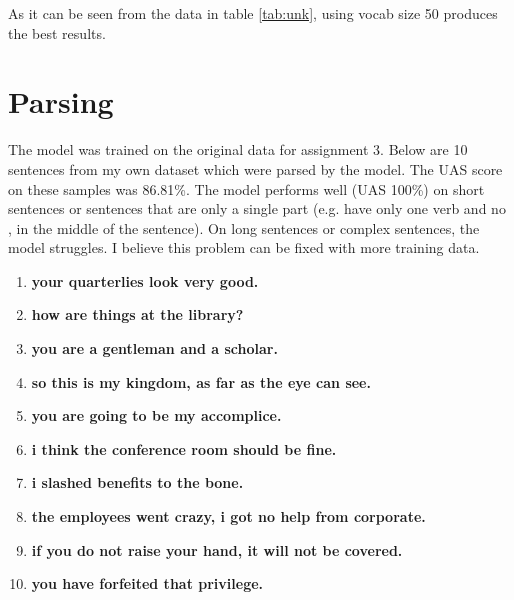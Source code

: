 \documentclass[11pt]{article}
\begin{document}
As it can be seen from the data in table \ref{tab:unk}, using vocab size 50 produces the best results.

\section{Parsing}

The model was trained on the original data for assignment 3. Below are 10 sentences from my own dataset which were parsed by the model. The UAS score on these samples was 86.81\%. The model performs well (UAS 100\%) on short sentences or sentences that are only a single part (e.g. have only one verb and no , in the middle of the sentence). On long sentences or complex sentences, the model struggles. I believe this problem can be fixed with more training data.

\begin{enumerate}
    \item \textbf{your quarterlies look very good.} \newline [(2, 1), (3, 2), (5, 4), (3, 5), (3, 6), (0, 3)]
    \item \textbf{how are things at the library?} \newline [(3, 2), (3, 1), (6, 5), (6, 4), (3, 6), (3, 7), (0, 3)]
    \item \textbf{you are a gentleman and a scholar.} \newline [(4, 3), (4, 2), (4, 1), (4, 5), (7, 6), (4, 7), (4, 8), (0, 4)]
    \item \textbf{so this is my kingdom, as far as the eye can see.} \newline [(5, 4), (5, 3), (5, 2), (5, 1), (5, 6), (8, 7), (11, 10), (13, 12), (13, 11), (13, 9), (8, 13), (5, 8), (5, 14), (0, 5)] 
    \item \textbf{you are going to be my accomplice.} \newline [(3, 2), (3, 1), (7, 6), (7, 5), (7, 4), (3, 7), (3, 8), (0, 3)]
    \item \textbf{i think the conference room should be fine.} \newline [(2, 1), (5, 4), (5, 3), (8, 7), (8, 6), (8, 5), (2, 8), (2, 9), (0, 2)]
    \item \textbf{i slashed benefits to the bone.} \newline [(2, 1), (6, 5), (6, 4), (3, 6), (2, 3), (2, 7), (0, 2)]
    \item \textbf{the employees went crazy, i got no help from corporate.} \newline [(2, 1), (3, 2), (3, 4), (7, 6), (7, 5), (7, 3), (9, 8), (11, 10), (9, 11), (7, 9), (7, 12), (0, 7)]
    \item \textbf{if you do not raise your hand, it will not be covered.} \newline [(5, 4), (5, 3), (5, 2), (5, 1), (7, 6), (5, 7), (13, 12), (13, 11), (13, 10), (13, 9), (13, 8), (13, 5), (13, 14), (0, 13)]
    \item \textbf{you have forfeited that privilege.} \newline [(3, 2), (3, 1), (5, 4), (3, 5), (3, 6), (0, 3)]
\end{enumerate}
\end{document}
